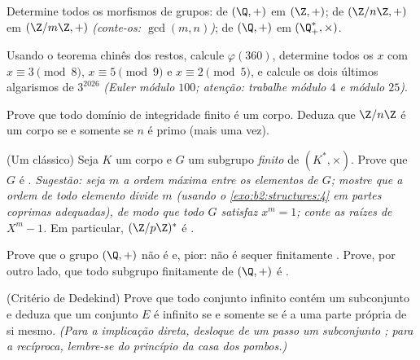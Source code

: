 \begin{exercise}[$\star\star$]\label{exo:b2:structures:7}
Determine todos os morfismos de grupos: de $(\Q, +)$ em $(\Z, +)$; de
$(\Z/n\Z, +)$ em $(\Z/m\Z, +)$ \emph{(conte-os:
$\gcd(m,n)$)}; de $(\Q, +)$ em $(\Q_+^*, \times)$.
\end{exercise}

\begin{exercise}[$\star\star$]\label{exo:b2:structures:8}
Usando o teorema chinês dos restos, calcule $\varphi(360)$, determine
todos os $x$ com $x \equiv 3 \pmod 8$, $x \equiv 5 \pmod 9$ e $x
\equiv 2 \pmod 5$, e calcule os dois últimos algarismos de $3^{2026}$
\emph{(Euler módulo $100$; atenção: trabalhe módulo $4$ e módulo $25$)}.
\end{exercise}

\begin{exercise}[$\star\star\star$]\label{exo:b2:structures:9}
Prove que todo domínio de integridade finito é um corpo. Deduza que
$\Z/n\Z$ é um corpo se e somente se $n$ é primo (mais uma vez).
\end{exercise}

\begin{exercise}[$\star\star\star$]\label{exo:b2:structures:10}
(Um clássico) Seja $K$ um corpo e $G$ um subgrupo \emph{finito} de
$(K^*, \times)$. Prove que $G$ é .
\emph{Sugestão: seja $m$ a ordem máxima entre os elementos de $G$;
mostre que a ordem de todo elemento divide $m$ (usando o
\cref{exo:b2:structures:4} em partes coprimas adequadas), de modo que todo $G$
satisfaz $x^m = 1$; conte as raízes de $X^m - 1$.}
Em particular, $(\Z/p\Z)^*$ é .
\end{exercise}

\begin{exercise}[$\star\star\star$]\label{exo:b2:structures:11}
Prove que o grupo $(\Q, +)$ não é  e, pior: não é
sequer finitamente . Prove, por outro lado, que todo subgrupo
finitamente  de $(\Q, +)$ é .
\end{exercise}

\begin{exercise}[$\star\star$]\label{exo:b2:structures:12}
(Critério de Dedekind) Prove que todo conjunto infinito contém um
subconjunto  e deduza que um conjunto $E$ é infinito se e somente
se é  a uma parte própria de si mesmo. \emph{(Para a
implicação direta, desloque de um passo um subconjunto ; para a
recíproca, lembre-se do princípio da casa dos pombos.)}
\end{exercise}

